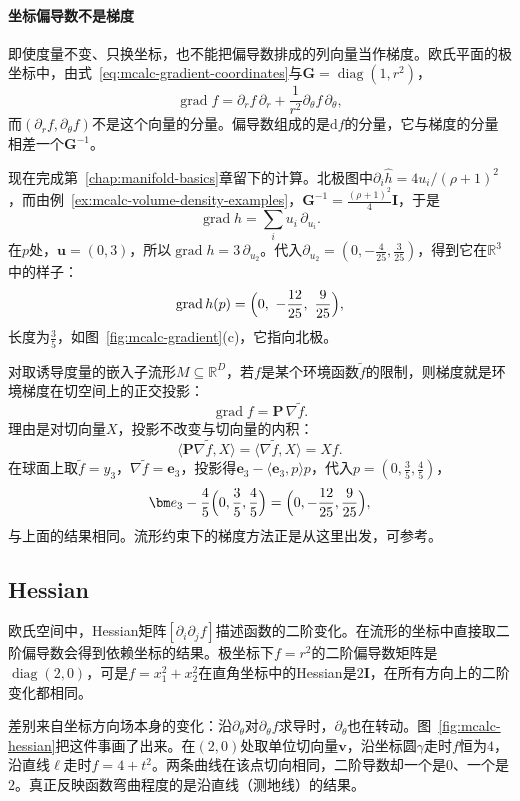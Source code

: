 \paragraph{坐标偏导数不是梯度}
即使度量不变、只换坐标，也不能把偏导数排成的列向量当作梯度。欧氏平面的极坐标中，由式~\eqref{eq:mcalc-gradient-coordinates}与$\bm G=\operatorname{diag}(1,r^2)$，
\[
\operatorname{grad}f=\partial_rf\,\partial_r+\frac1{r^2}\partial_\theta f\,\partial_\theta ,
\]
而$(\partial_rf,\partial_\theta f)$不是这个向量的分量。偏导数组成的是$\mathrm df$的分量，它与梯度的分量相差一个$\bm G^{-1}$。

现在完成第~\ref{chap:manifold-basics}章留下的计算。北极图中$\partial_i\hat h=4u_i/(\rho+1)^2$，而由例~\ref{ex:mcalc-volume-density-examples}，$\bm G^{-1}=\frac{(\rho+1)^2}4\bm I$，于是
\[
\operatorname{grad}h=\sum_iu_i\,\partial_{u_i}.
\]
在$p$处，$\bm u=(0,3)$，所以$\operatorname{grad}h=3\,\partial_{u_2}$。代入$\partial_{u_2}=(0,-\tfrac4{25},\tfrac3{25})$，得到它在$\mathbb R^3$中的样子：
\[
\operatorname{grad}h(p)=\Bigl(0,\ -\frac{12}{25},\ \frac9{25}\Bigr),
\]
长度为$\tfrac35$，如图~\ref{fig:mcalc-gradient}(c)，它指向北极。

对取诱导度量的嵌入子流形$M\subseteq\mathbb R^D$，若$f$是某个环境函数$\tilde f$的限制，则梯度就是环境梯度在切空间上的正交投影：
\[
\operatorname{grad}f=\bm P\,\nabla\tilde f .
\]
理由是对切向量$X$，投影不改变与切向量的内积：
\[
\langle\bm P\nabla\tilde f,X\rangle=\langle\nabla\tilde f,X\rangle=Xf .
\]
在球面上取$\tilde f=y_3$，$\nabla\tilde f=\bm e_3$，投影得$\bm e_3-\langle\bm e_3,p\rangle p$，代入$p=(0,\tfrac35,\tfrac45)$，
\[
\bm e_3-\frac45\Bigl(0,\frac35,\frac45\Bigr)=\Bigl(0,-\frac{12}{25},\frac9{25}\Bigr),
\]
与上面的结果相同。流形约束下的梯度方法正是从这里出发，可参考。

\subsection{Hessian}
\label{sec:mcalc-hessian}

欧氏空间中，Hessian矩阵$[\partial_i\partial_jf]$描述函数的二阶变化。在流形的坐标中直接取二阶偏导数会得到依赖坐标的结果。极坐标下$f=r^2$的二阶偏导数矩阵是$\operatorname{diag}(2,0)$，可是$f=x_1^2+x_2^2$在直角坐标中的Hessian是$2\bm I$，在所有方向上的二阶变化都相同。

差别来自坐标方向场本身的变化：沿$\partial_\theta$对$\partial_\theta f$求导时，$\partial_\theta$也在转动。图~\ref{fig:mcalc-hessian}把这件事画了出来。在$(2,0)$处取单位切向量$\bm v$，沿坐标圆$\gamma$走时$f$恒为$4$，沿直线$\ell$走时$f=4+t^2$。两条曲线在该点切向相同，二阶导数却一个是$0$、一个是$2$。真正反映函数弯曲程度的是沿直线（测地线）的结果。

